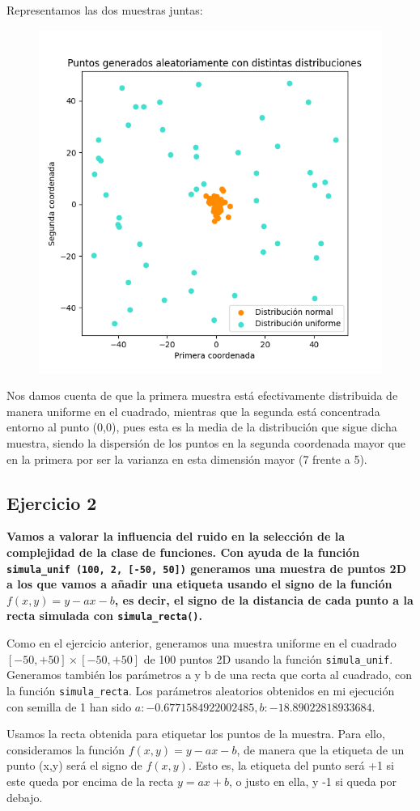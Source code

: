 \documentclass[a4]{article}
\begin{document}
Representamos las dos muestras juntas:
\begin{figure}[H]
	\centering
	\includegraphics[width=0.6\linewidth]{img/Figure_3}
	\caption{}
	\label{fig:figure3}
\end{figure}
Nos damos cuenta de que la primera muestra está efectivamente distribuida de manera uniforme en el cuadrado, mientras que la segunda está concentrada entorno al punto (0,0), pues esta es la media de la distribución que sigue dicha muestra, siendo la dispersión de los puntos en la segunda coordenada mayor que en la primera por ser la varianza en esta dimensión mayor (7 frente a 5).

\subsection{Ejercicio 2}
\textbf{Vamos a valorar la influencia del ruido en la selección de la complejidad de la clase
de funciones. Con ayuda de la función \lstinline|simula_unif (100, 2, [-50, 50])| generamos una
muestra de puntos 2D a los que vamos a añadir una etiqueta usando el signo de la función
$ f (x, y) = y - ax - b $, es decir, el signo de la distancia de cada punto a la recta simulada con
\lstinline|simula_recta()|.}

Como en el ejercicio anterior, generamos una muestra uniforme en el cuadrado $ [-50, +50]\times [-50, +50] $ de 100 puntos 2D usando la función \lstinline|simula_unif|. Generamos también los parámetros a y b de una recta que corta al cuadrado, con la función \lstinline|simula_recta|. Los parámetros aleatorios obtenidos en mi ejecución con semilla de 1 han sido $ a:  -0.6771584922002485,  b: -18.89022818933684 $. 

Usamos la recta obtenida para etiquetar los puntos de la muestra. Para ello, consideramos la función $ f (x, y) = y - ax - b $, de manera que la etiqueta de un punto (x,y) será el signo de $ f (x, y)$. Esto es, la etiqueta del punto será +1 si este queda por encima de la recta $y=ax+b$, o justo en ella, y -1 si queda por debajo. 
\end{document}
